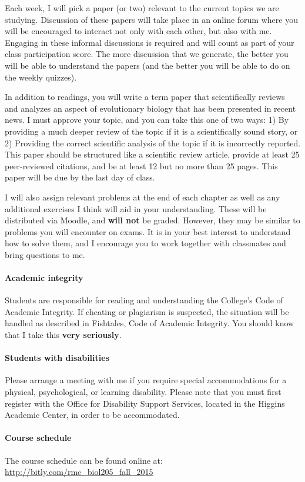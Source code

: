\documentclass{article}
\begin{document}
Each week, I will pick a paper (or two) relevant to the current topics we are
studying. Discussion of these papers will take place in an online forum where
you will be encouraged to interact not only with each other, but also with me.
Engaging in these informal discussions is required and will count as part of
your class participation score. The more discussion that we generate, the
better you will be able to understand the papers (and the better you will be
able to do on the weekly quizzes).

In addition to readings, you will write a term paper that scientifically
reviews and analyzes an aspect of evolutionary biology that has been presented
in recent news. I must approve your topic, and you can take this one of two
ways: 1) By providing a much deeper review of the topic if it is a
scientifically sound story, or 2) Providing the correct scientific analysis of
the topic if it is incorrectly reported. This paper should be structured like
a scientific review article, provide at least 25 peer-reviewed citations, and
be at least 12 but no more than 25 pages.  This paper will be due by the last
day of class.

I will also assign relevant problems at the end of each chapter as well as any
additional exercises I think will aid in your understanding. These will be
distributed via Moodle, and \textbf{will not} be graded.  However, they may be
similar to problems you will encounter on exams.  It is in your best interest
to understand how to solve them, and I encourage you to work together with
classmates and bring questions to me.



\paragraph{Academic integrity}
Students are responsible for reading and
understanding the College's Code of Academic Integrity.  If cheating or
plagiarism is suspected, the situation will be handled as described in
Fishtales, Code of Academic Integrity. You should know that I take this \textbf
{very seriously}.

\paragraph{Students with disabilities}
Please arrange a meeting with me if you
require special accommodations for a physical, psychological, or learning
disability.  Please note that you must first register with the Office for
Disability Support Services, located in the Higgins Academic Center, in order
to be accommodated.

\paragraph{Course schedule}
The course schedule can be found online at:\\
\url{http://bitly.com/rmc_biol205_fall_2015}
\end{document}
